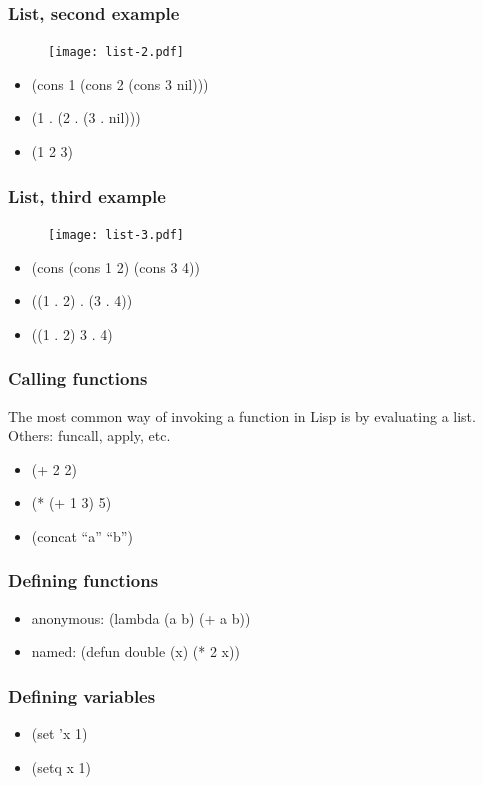 \documentclass[16pt]{beamer}
\begin{document}
\begin{frame}
  \frametitle{List, second example}
  \begin{figure}
    \texttt{[image: list-2.pdf]}
  \end{figure}
  \begin{itemize}
  \item (cons 1 (cons 2 (cons 3 nil)))
  \item (1 . (2 . (3 . nil)))
  \item (1 2 3)
  \end{itemize}
\end{frame}

\begin{frame}
  \frametitle{List, third example}
  \begin{figure}
    \texttt{[image: list-3.pdf]}
  \end{figure}
  \begin{itemize}
  \item (cons (cons 1 2) (cons 3 4))
  \item ((1 . 2) . (3 . 4))
  \item ((1 . 2) 3 . 4)
  \end{itemize}
\end{frame}

\begin{frame}
  \frametitle{Calling functions}
  \begin{block}{}
    The most common way of invoking a function in Lisp is by
    evaluating a list. Others: funcall, apply, etc.
  \end{block}
  \begin{itemize}
  \item (+ 2 2)
  \item (* (+ 1 3) 5)
  \item (concat ``a'' ``b'')
  \end{itemize}
\end{frame}

\begin{frame}
  \frametitle{Defining functions}
  \begin{itemize}
  \item anonymous: (lambda (a b) (+ a b))
  \item named: (defun double (x) (* 2 x))
  \end{itemize}
\end{frame}

\begin{frame}
  \frametitle{Defining variables}
  \begin{itemize}
  \item (set 'x 1)
  \item (setq x 1)
  \end{itemize}
\end{frame}
\end{document}
